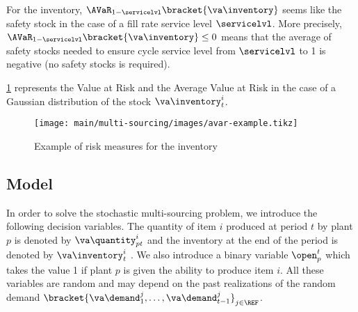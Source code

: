 For the inventory, $\AVaR_{1-\servicelvl}\bracket{\va\inventory}$ seems like the safety stock in the case of a fill rate service level $\servicelvl$.
More precisely, $\AVaR_{1-\servicelvl}\bracket{\va\inventory}\le 0$ means that the average of safety stocks needed to ensure cycle service level from $\servicelvl$ to 1 is negative (\ie no safety stocks is required).


\cref{fig:avar-examples} represents the Value at Risk and the Average Value at Risk in the case of a Gaussian distribution of the stock $\va\inventory_t^i$.


\begin{figure}[h]
  \centering
  \texttt{[image: main/multi-sourcing/images/avar-example.tikz]}
  \caption{Example of risk measures for the inventory}
  \label{fig:avar-examples}
\end{figure}



\subsection{Model}


In order to solve the stochastic multi-sourcing problem, we introduce the following decision variables.
The quantity of item $i$ produced at period $t$ by plant $p$ is denoted by $\va\quantity_{pt}^i$ and the inventory at the end of the period is denoted by $\va\inventory_t^i$ .
We also introduce a binary variable $\open_p^t$ which takes the value 1 if plant $p$ is given the ability to produce item $i$.
All these variables are random and may depend on the past realizations of the random demand $\bracket{\va\demand_1^j,\ldots,\va\demand_{t-1}^j}_{j\in\REF}$.


